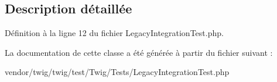 \subsection{Description détaillée}


Définition à la ligne 12 du fichier Legacy\+Integration\+Test.\+php.



La documentation de cette classe a été générée à partir du fichier suivant \+:\begin{DoxyCompactItemize}
\item 
vendor/twig/twig/test/\+Twig/\+Tests/Legacy\+Integration\+Test.\+php\end{DoxyCompactItemize}
